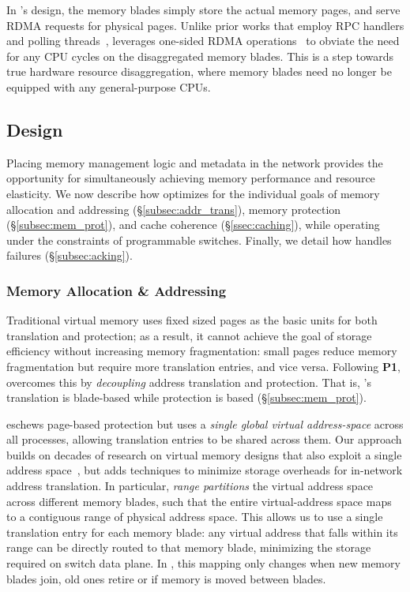 In \mind's design, the memory blades simply store the actual memory pages, and serve RDMA requests for physical pages. Unlike prior works that employ RPC handlers and polling threads~\cite{legoos}, \mind leverages one-sided RDMA operations~\cite{farm} to obviate the need for any CPU cycles on the disaggregated memory blades. This is a step towards true hardware resource disaggregation, where memory blades need no longer be equipped with any general-purpose CPUs.

\subsection{\mind Design}
\label{ssec:minddesign}

Placing memory management logic and metadata in the network provides the opportunity for simultaneously achieving memory performance and resource elasticity. We now describe how \mind optimizes for the individual goals of memory allocation and addressing (\S\ref{subsec:addr_trans}), memory protection (\S\ref{subsec:mem_prot}), and cache coherence (\S\ref{ssec:caching}), while operating under the constraints of programmable switches. Finally, we detail how \mind handles failures (\S\ref{subsec:acking}). %

\subsubsection{Memory Allocation \& Addressing}
\label{sssec:addr_trans}

Traditional virtual memory uses fixed sized pages as the basic units for both translation and protection; as a result, it cannot achieve the goal of storage efficiency without increasing memory fragmentation: small pages reduce memory fragmentation but require more translation entries, and vice versa.  Following \textbf{P1}, \mind overcomes this by \textit{decoupling} address translation and protection.  That is, \mind's translation is blade-based while protection is  based (\S\ref{subsec:mem_prot}).

 \mind eschews page-based protection but uses a \textit{single global virtual address-space} across all processes, allowing translation entries to be shared across them. Our approach builds on decades of research on virtual memory designs that also exploit a single address space~\cite{cheri, cap, gam, grappa, opal}, but adds techniques to minimize storage overheads for in-network address translation.
In particular, \mind \textit{range partitions} the virtual address space across different memory blades, such that the entire virtual-address space maps to a contiguous range of physical address space. This allows us to use a single translation entry for each memory blade: any virtual address that falls within its range can be directly routed to that memory blade, minimizing the storage required on switch data plane. In \mind, this mapping only changes when new memory blades join, old ones retire or if memory is moved between blades.

